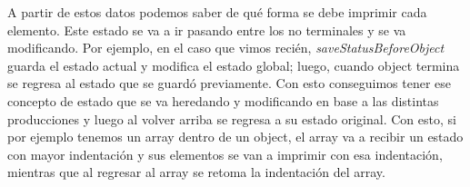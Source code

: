 A partir de estos datos podemos saber de qué forma se debe imprimir cada elemento. Este estado se va a ir pasando entre los no terminales y se va modificando. Por ejemplo, en el caso que vimos recién, \textit{saveStatusBeforeObject} guarda el estado actual y modifica el estado global; luego, cuando object termina se regresa al estado que se guardó previamente. Con esto conseguimos tener ese concepto de estado que se va heredando y modificando en base a las distintas producciones y luego al volver arriba se regresa a su estado original. Con esto, si por ejemplo tenemos un array dentro de un object, el array va a recibir un estado con mayor indentación y sus elementos se van a imprimir con esa indentación, mientras que al regresar al array se retoma la indentación del array.
